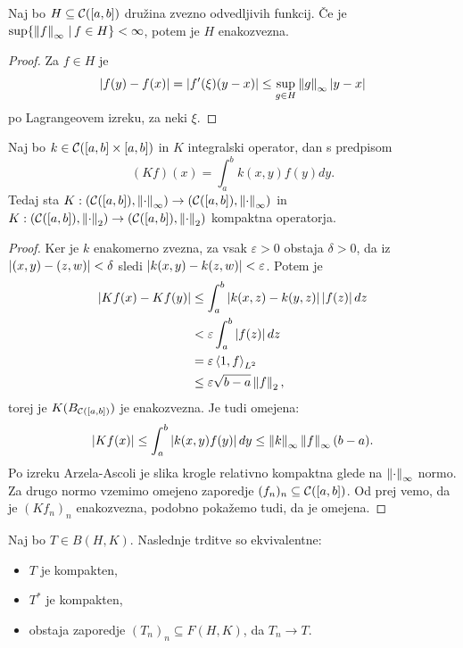 \begin{trditev}
  Naj bo $H \subseteq \mathcal{C}([a,b])$ družina zvezno odvedljivih funkcij.
  Če je $\sup \{ \left\lVert f\right\rVert_\infty \,|\, f \in H \} < \infty$, potem je $H$
  enakozvezna.
\end{trditev}

\begin{proof}
  Za $f \in H$ je
  \[
	\left| f(y) - f(x) \right| = \left| f'(\xi) (y-x) \right| \le \sup_{g \in H} \left\lVert g\right\rVert_\infty
	\left| y-x \right|
  \]
  po Lagrangeovem izreku, za neki $\xi$.
\end{proof}

\begin{izrek}
  Naj bo $k \in \mathcal{C}([a,b] \times [a,b])$ in $K$ integralski operator, dan s
  predpisom
  \[
	(Kf)(x) = \int_a^b k(x,y) f(y) dy.
  \]
  Tedaj sta $K: (\mathcal{C}([a,b]), \left\lVert\cdot\right\rVert_\infty) \to (\mathcal{C}([a,b]),
  \left\lVert\cdot\right\rVert_\infty)$ in $K: (\mathcal{C}([a,b]), \left\lVert\cdot\right\rVert_2) \to
  (\mathcal{C}([a,b]), \left\lVert\cdot\right\rVert_2)$ kompaktna operatorja.
\end{izrek}

\begin{proof}
  Ker je $k$ enakomerno zvezna, za vsak $\varepsilon > 0$ obstaja $\delta > 0$,
  da iz $\left| (x,y) - (z,w) \right| < \delta$ sledi $\left| k(x,y) - k(z,w) \right| <
  \varepsilon$.
  Potem je
  \begin{align*}
	\left| Kf(x) - Kf(y) \right|
	&\le \int_a^b \left| k(x,z) - k(y,z) \right| \left| f(z) \right| dz \\
	&< \varepsilon \int_a^b \left| f(z) \right| dz \\
	&= \varepsilon \left< 1, f \right>_{L^2} \\
	&\le \varepsilon \sqrt{b-a} \left\lVert f\right\rVert_2,
  \end{align*}
  torej je $K(B_{\mathcal{C}([a,b])})$ je enakozvezna.
  Je tudi omejena:
  \[
	\left| Kf(x) \right|
	\le \int_a^b \left| k(x,y) f(y) \right| dy
	\le \left\lVert k\right\rVert_\infty \left\lVert f\right\rVert_\infty (b-a).
  \]
  Po izreku Arzela-Ascoli je slika krogle relativno kompaktna glede na
  $\left\lVert\cdot\right\rVert_\infty$ normo.
  Za drugo normo vzemimo omejeno zaporedje $(f_n)_n \subseteq \mathcal{C}([a,b])$.
  Od prej vemo, da je $(Kf_n)_n$ enakozvezna, podobno pokažemo tudi, da je
  omejena.
\end{proof}



\begin{izrek}
  Naj bo $T \in B(H,K)$.
  Naslednje trditve so ekvivalentne:
  \begin{itemize}
  \item $T$ je kompakten,
  \item $T^*$ je kompakten,
  \item obstaja zaporedje $(T_n)_n \subseteq F(H,K)$, da $T_n \to T$.
  \end{itemize}
\end{izrek}

